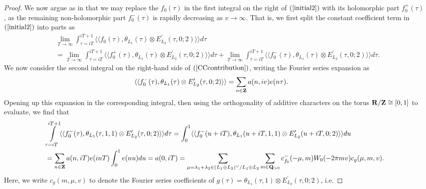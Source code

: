\documentclass{amsart}
\theoremstyle{definition}
\begin{document}
\begin{proof}
We now argue as in \cite[Theorem 3.5, (3.12), (3.11)]{Eh}
that we may replace the $f_0(\tau)$ in the first integral on the right of $(\ref{initial2})$ with its holomorphic part $f_0^+(\tau)$,
as the remaining non-holomorphic part $f_0^-(\tau)$ is rapidly decreasing as $v \rightarrow \infty$. 
That is, we first split the constant coefficient term in $(\ref{initial2})$ into parts as 
\begin{equation}\begin{aligned}\label{CCcontribution} &\lim_{T \rightarrow \infty} \int_{\tau = i T}^{iT +1} 
\langle \langle f_0(\tau), \theta_{L_1}(\tau) \otimes E^{\prime}_{L_2}(\tau, 0; 2)\rangle \rangle d \tau \\
&= \lim_{T \rightarrow \infty} \int_{\tau = i T}^{iT +1} \langle \langle f^+_0(\tau), \theta_{L_1}(\tau) \otimes E^{\prime }_{L_2}(\tau, 0; 2)\rangle \rangle d \tau 
+ \lim_{T \rightarrow \infty} \int_{\tau = i T}^{iT +1} \langle \langle f^-_0(\tau), \theta_{L_1}(\tau) \otimes E^{\prime}_{L_2}(\tau, 0; 2)\rangle \rangle d \tau. 
\end{aligned}\end{equation}
We now consider the second integral on the right-hand side of $(\ref{CCcontribution})$, writing the Fourier series expansion as 
\begin{align*} \langle \langle f_0^-(\tau), \theta_{L_1}(\tau) \otimes E_{L_2}'(\tau, 0; 2) \rangle \rangle 
&= \sum\limits_{n \in {\bf{Z}}} a(n, i v) e(n \tau). \end{align*}
Opening up this expansion in the corresponding integral, then using the orthogonality of 
additive characters on the torus ${\bf{R}}/{\bf{Z}} \cong [0, 1]$ to evaluate, we find that
\begin{equation*}\begin{aligned}
&\int\limits_{\tau = i T}^{iT + 1} \langle \langle f_0^-(\tau), \theta_{L_1}(\tau, 1, 1) \otimes E_{L_2}'(\tau, 0; 2) \rangle \rangle d\tau
= \int_0^1 \langle \langle f_0^-(u + iT), \theta_{L_1}(u + iT, 1, 1) \otimes E_{L_2}'(u + iT, 0; 2) \rangle \rangle du \\
&= \sum\limits_{n \in {\bf{Z}}} a(n, iT) e(i n T) \int_0^1 e(nu)du = a(0, iT) 
= \sum\limits_{\mu = \lambda_1 + \lambda_2 \in (L_1 \oplus L_2)^{\vee}/ L_1 \oplus L_2} 
\sum\limits_{m \in {\bf{Q}}_{>0}} c_{f_0}^-(-\mu, m) W_0(- 2 \pi m v) c_g(\mu, m, v). \end{aligned}\end{equation*}
Here, we write $c_g(m, \mu, v)$ to denote the Fourier series coefficients of 
$g(\tau) = \theta_{L_1}(\tau, 1) \otimes E^{\prime}_{L_2}(\tau, 0; 2)$, i.e. 

\end{proof}
\end{document}
